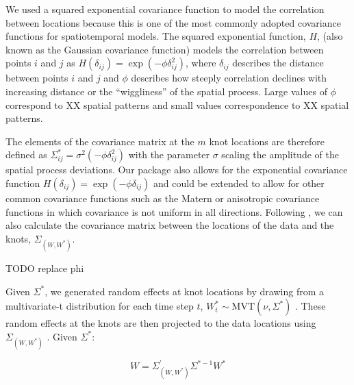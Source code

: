 \documentclass[12pt,english]{article}
\begin{document}
\begin{spacing}{1.25}
We used a squared exponential covariance function to model the correlation
between locations because this is one of the most commonly adopted covariance
functions for spatiotemporal models. The squared exponential function, $H$,
(also known as the Gaussian covariance function) models the correlation between
points $i$ and $j$ as $H(\delta_{ij}) = \exp \left(-\phi \delta_{ij}^2
\right)$, where $\delta_{ij}$ describes the distance between points $i$ and $j$
and $\phi$ describes how steeply correlation declines with increasing distance
or the ``wiggliness'' of the spatial process. Large values of $\phi$ correspond
to XX spatial patterns and small values correspondence to XX spatial patterns.

The elements of the covariance matrix at the $m$ knot locations are therefore
defined as $\Sigma_{ij}^*=\sigma^2 \left( -\phi \delta_{ij}^2 \right)$ with the
parameter $\sigma$ scaling the amplitude of the spatial process deviations. Our
package also allows for the exponential covariance function $H(\delta_{ij}) =
\exp \left(-\phi \delta_{ij} \right)$ and could be extended to allow for other
common covariance functions such as the Matern or anisotropic covariance
functions in which covariance is not uniform in all directions. 
Following \citet{latimer2009}, we can also calculate the covariance matrix
between the locations of the data and the knots, 
$\Sigma_{\left(W, W^* \right)}$. 

TODO replace phi



Given $\Sigma^*$, we generated random effects at knot
locations by drawing from a multivariate-t distribution for each time step $t$, 
$W_t^*\sim \mathrm{MVT}\left( \nu, \Sigma^{*} \right)$ .
These random effects at the knots are then projected to the data locations using
$\Sigma_{\left( W,W^{*} \right)}$ \citep{latimer2009}.
Given ${\Sigma}^{*}$:

\begin{equation}
W=\Sigma_{\left(W,W^* \right)}^{'} \Sigma^{*-1}W^*
\end{equation}


\end{spacing}
\end{document}
